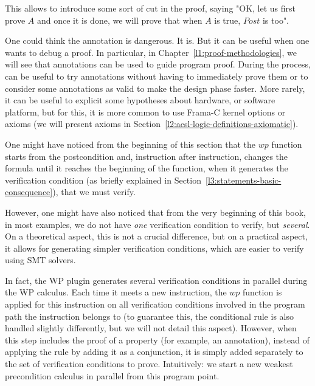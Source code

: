 This allows to introduce some sort of cut in the proof, saying "OK, let us first
prove $A$ and once it is done, we will prove that when $A$ is true, $Post$ is
too".


One could think the  annotation is dangerous. It is. But it
can be useful when one wants to debug a proof. In particular, in
Chapter~\ref{l1:proof-methodologies}, we will see that 
annotations can be used to guide program proof. During the process,
 can be useful to try annotations without having to
immediately prove them or to consider some annotations as valid to make the
design phase faster. More rarely, it can be useful to explicit some hypotheses
about hardware, or software platform, but for this, it is more common to use
Frama-C kernel options or axioms (we will present axioms in
Section~\ref{l2:acsl-logic-definitions-axiomatic}).




One might have noticed from the beginning of this section that the $wp$ function
starts from the postcondition and, instruction after instruction, changes the
formula until it reaches the beginning of the function, when it generates the
verification condition (as briefly explained in
Section~\ref{l3:statements-basic-consequence}), that we must verify.


However, one might have also noticed that from the very beginning of this book,
in most examples, we do not have \emph{one} verification condition to verify,
but \emph{several}. On a theoretical aspect, this is not a crucial difference,
but on a practical aspect, it allows for generating simpler verification conditions,
which are easier to verify using SMT solvers.


In fact, the WP plugin generates several verification conditions in parallel
during the WP calculus. Each time it meets a new instruction, the $wp$ function
is applied for this instruction on all verification conditions involved in the
program path the instruction belongs to (to guarantee this, the conditional
rule is also handled slightly differently, but we will not detail this aspect).
However, when this step includes the proof of a property (for example, an
 annotation), instead of applying the rule by adding it as a
conjunction, it is simply added separately to the set of verification conditions
to prove. Intuitively: we start a new weakest precondition calculus in parallel
from this program point.


